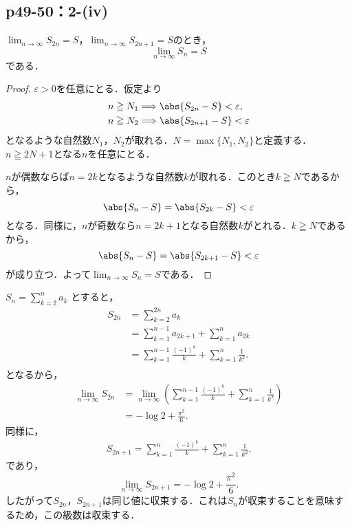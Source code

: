 \documentclass[a4paper,10pt,fleqn]{ltjsarticle}
\begin{document}
    \subsection*{p49-50：2-(iv)}


    $\lim_{n \to \infty} S_{2n}=S$，$\lim_{n \to \infty} S_{2n+1}=S$のとき，
    \[
    \lim_{n \to \infty} S_n = S
    \]
    である．

    \begin{proof}
    $\varepsilon >0$を任意にとる．仮定より
    \begin{align*} 
       &  n \geqq N_1 \Longrightarrow \abs{S_{2n}-S} < \varepsilon, \\
       & n \geqq N_2 \Longrightarrow \abs{S_{2n+1}-S} < \varepsilon
    \end{align*}
    となるような自然数$N_1$，$N_2$が取れる．$N=\max\{N_1, N_2\}$と定義する．$n \geqq 2N +1$となる$n$を任意にとる．

    $n$が偶数ならば$n =2k$となるような自然数$k$が取れる．このとき$k \geqq N$であるから，
    \[
    \abs{S_n -S}=\abs{S_{2k}-S}<\varepsilon 
    \]
    となる．同様に，$n$が奇数なら$n =2k+1$となる自然数$k$がとれる．$k \geqq N$であるから，
    \[
    \abs{S_n -S}=\abs{S_{2k+1}-S}<\varepsilon 
    \]
    が成り立つ．よって$\lim_{n \to \infty} S_n =S$である．
    \end{proof}

    \begin{screen}
  $S_{n} = \sum ^{n}_{k=2} a_k$ とすると，
  \begin{align*}
    S_{2n} &= \sum ^{2n}_{k=2} a_{k}\\
    &= \sum ^{n-1}_{k=1} a_{2k+1} + \sum ^{n}_{k=1} a_{2k} \\
    &= \sum ^{n-1}_{k=1} \frac{(-1)^k}{k} + \sum ^{n}_{k=1} \frac{1}{k^2}. \\
  \end{align*}
  となるから，
  \begin{align*}
   \lim_{n \to \infty} S_{2n}&=\lim_{n \to \infty} \left (\sum ^{n-1}_{k=1} \frac{(-1)^k}{k} + \sum ^{n}_{k=1} \frac{1}{k^2} \right ) \\
   & = -\log 2 + \frac{\pi^2}{6}.
  \end{align*}
  同様に，
  \begin{align*}
    S_{2n+1} = \sum ^{n}_{k=1} \frac{(-1)^k}{k} + \sum ^{n}_{k=1} \frac{1}{k^2}.
  \end{align*}
  であり，
  \[
    \lim_{n \to \infty} S_{2n+1} = -\log 2 + \frac{\pi^2}{6}.
  \]
  したがって$S_{2n}$，$S_{2n+1}$は同じ値に収束する．これは$S_{n}$が収束することを意味するため，この級数は収束する．
\end{screen}
\end{document}
